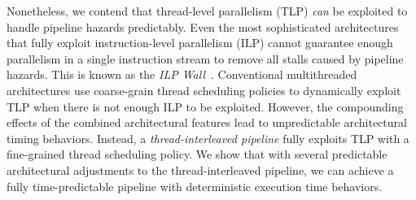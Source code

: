 Nonetheless, we contend that thread-level parallelism (TLP) \emph{can} be exploited to handle pipeline hazards predictably. 
Even the most sophisticated architectures that fully exploit instruction-level parallelism (ILP) cannot guarantee enough parallelism in a single instruction stream to remove all stalls caused by pipeline hazards. 
This is known as the \emph{ILP Wall}~. 
Conventional multithreaded architectures use coarse-grain thread scheduling policies to dynamically exploit TLP when there is not enough ILP to be exploited.    
However, the compounding effects of the combined architectural features lead to unpredictable architectural timing behaviors.
Instead, a \emph{thread-interleaved pipeline} fully exploits TLP with a fine-grained thread scheduling policy.
We show that with several predictable architectural adjustments to the thread-interleaved pipeline, we can achieve a fully time-predictable pipeline 
with deterministic execution time behaviors.     


